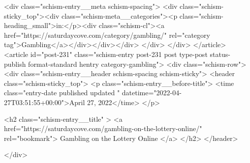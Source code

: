 {		<div class="schism-entry__meta schism-spacing">			<div class="schism-sticky_top"><div class="schism-meta__categories"><p class="schism-heading_small">in:</p><div class="schism-cl"><a href="https://saturdaycove.com/category/gambling/" rel="category tag">Gambling</a></div></div></div>		</div>
	</div>
</article>
<article id="post-231" class="schism-entry post-231 post type-post status-publish format-standard hentry category-gambling">
	<div class="schism-row">		<div class="schism-entry__header schism-spacing schism-sticky">			<header class="schism-sticky_top">				<p class="schism-entry__before-title">
					<time class="entry-date published updated " datetime="2022-04-27T03:51:55+00:00">April 27, 2022</time>				</p>

				<h2 class="schism-entry__title" >
					<a href="https://saturdaycove.com/gambling-on-the-lottery-online/" rel="bookmark">
						Gambling on the Lottery Online					</a>
				</h2>
			</header>

					</div>

}
